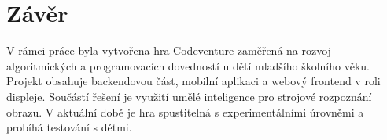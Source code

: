 \chapter{Závěr}

V rámci práce byla vytvořena hra Codeventure zaměřená na rozvoj algoritmických a programovacích dovedností u dětí mladšího školního věku. Projekt obsahuje backendovou část, mobilní aplikaci a webový frontend v roli displeje. Součástí řešení je využití umělé inteligence pro strojové rozpoznání obrazu. V aktuální době je hra spustitelná s experimentálními úrovněmi a probíhá testování s dětmi.